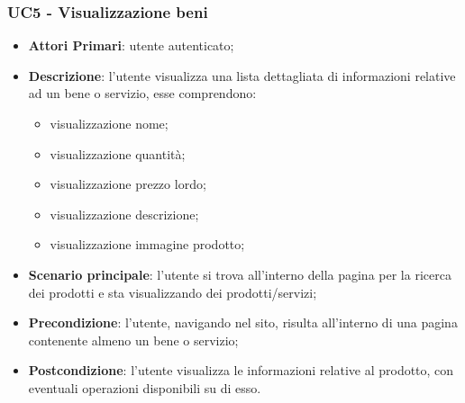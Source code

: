  \subsubsection{UC5 - Visualizzazione beni}
 \begin{itemize}
 	\item \textbf{Attori Primari}: utente autenticato;
 	\item \textbf{Descrizione}: l'utente visualizza una lista dettagliata di informazioni relative ad un bene o servizio, esse comprendono:
 	\begin{itemize}
 		\item visualizzazione nome;
 		\item visualizzazione quantità;
 		\item visualizzazione prezzo lordo;
 		\item visualizzazione descrizione;
 		\item visualizzazione immagine prodotto;
 	\end{itemize}
 	\item \textbf{Scenario principale}: l'utente si trova all'interno della pagina per la ricerca dei prodotti e sta visualizzando dei prodotti/servizi;
 	
 	\item \textbf{Precondizione}: l'utente, navigando nel sito, risulta all'interno di una pagina contenente almeno un bene o servizio;
 	\item \textbf{Postcondizione}: l'utente visualizza le informazioni relative al prodotto, con eventuali operazioni disponibili su di esso.
 \end{itemize}
 